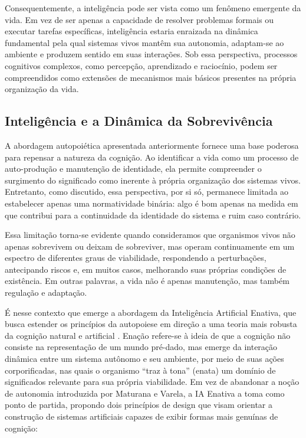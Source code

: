 Consequentemente, a inteligência pode ser vista como um fenômeno emergente da vida. Em vez de ser apenas a capacidade de resolver problemas formais ou executar tarefas específicas, inteligência estaria enraizada na dinâmica fundamental pela qual sistemas vivos mantêm sua autonomia, adaptam-se ao ambiente e produzem sentido em suas interações. Sob essa perspectiva, processos cognitivos complexos, como percepção, aprendizado e raciocínio, podem ser compreendidos como extensões de mecanismos mais básicos presentes na própria organização da vida.

\subsection{Inteligência e a Dinâmica da Sobrevivência}

A abordagem autopoiética apresentada anteriormente fornece uma base poderosa para repensar a natureza da cognição. Ao identificar a vida como um processo de auto-produção e manutenção de identidade, ela permite compreender o surgimento do significado como inerente à própria organização dos sistemas vivos. Entretanto, como discutido, essa perspectiva, por si só, permanece limitada ao estabelecer apenas uma normatividade binária: algo é bom apenas na medida em que contribui para a continuidade da identidade do sistema e ruim caso contrário.

Essa limitação torna-se evidente quando consideramos que organismos vivos não apenas sobrevivem ou deixam de sobreviver, mas operam continuamente em um espectro de diferentes graus de viabilidade, respondendo a perturbações, antecipando riscos e, em muitos casos, melhorando suas próprias condições de existência. Em outras palavras, a vida não é apenas manutenção, mas também regulação e adaptação.

É nesse contexto que emerge a abordagem da Inteligência Artificial Enativa, que busca estender os princípios da autopoiese em direção a uma teoria mais robusta da cognição natural e artificial \cite{FROESE2009}. Enação refere-se à ideia de que a cognição não consiste na representação de um mundo pré-dado, mas emerge da interação dinâmica entre um sistema autônomo e seu ambiente, por meio de suas ações corporificadas, nas quais o organismo “traz à tona” (enata) um domínio de significados relevante para sua própria viabilidade. Em vez de abandonar a noção de autonomia introduzida por Maturana e Varela, a IA Enativa a toma como ponto de partida, propondo dois princípios de design que visam orientar a construção de sistemas artificiais capazes de exibir formas mais genuínas de cognição:


